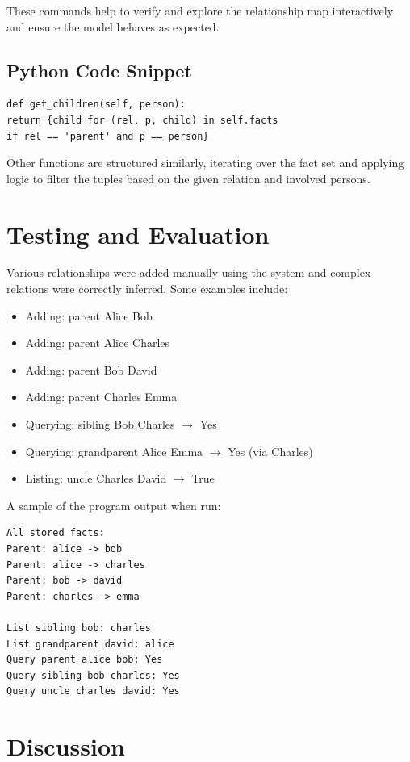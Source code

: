 \documentclass[a4paper, journal]{IEEEtran}
\begin{document}
These commands help to verify and explore the relationship map interactively and ensure the model behaves as expected.

\subsection{Python Code Snippet}

\begin{lstlisting}[caption={Function to Get Children of a Person}]
def get_children(self, person):
return {child for (rel, p, child) in self.facts
if rel == 'parent' and p == person}
\end{lstlisting}

Other functions are structured similarly, iterating over the fact set and applying logic to filter the tuples based on the given relation and involved persons.

\section{Testing and Evaluation}

Various relationships were added manually using the system and complex relations were correctly inferred. Some examples include:

\begin{itemize}
    \item Adding: parent Alice Bob
    \item Adding: parent Alice Charles
    \item Adding: parent Bob David
    \item Adding: parent Charles Emma
    \item Querying: sibling Bob Charles $\rightarrow$  Yes
    \item Querying: grandparent Alice Emma $\rightarrow$ Yes (via Charles)
    \item Listing: uncle Charles David $\rightarrow$ True
\end{itemize}

A sample of the program output when run:
\begin{verbatim}
All stored facts:
Parent: alice -> bob
Parent: alice -> charles
Parent: bob -> david
Parent: charles -> emma

List sibling bob: charles
List grandparent david: alice
Query parent alice bob: Yes
Query sibling bob charles: Yes
Query uncle charles david: Yes
\end{verbatim}

\section{Discussion}
\end{document}
